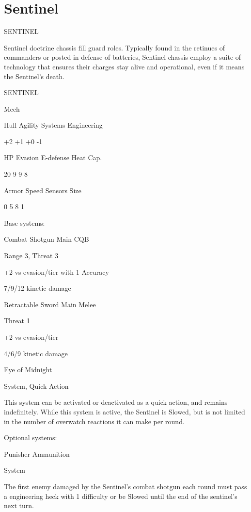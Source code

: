 \section{Sentinel}

                                              SENTINEL  

Sentinel doctrine chassis fill guard roles. Typically found in the retinues of commanders or posted  
in defense of batteries, Sentinel chassis employ a suite of technology that ensures their charges  
stay alive and operational, even if it means the Sentinel’s death. 
 

 SENTINEL 

 Mech 

 Hull       Agility     Systems       Engineering 

 +2         +1           +0           -1 

 HP         Evasion      E-defense    Heat Cap. 

 20         9            9            8 

 Armor      Speed       Sensors       Size 

 0          5            8            1
 

Base systems:  

Combat Shotgun  
Main CQB
 
Range 3, Threat 3
 
+2 vs evasion/tier with 1 Accuracy
 
7/9/12 kinetic damage
 

Retractable Sword  
Main Melee
 
Threat 1
 
+2 vs evasion/tier
 
4/6/9 kinetic damage
 

Eye of Midnight
 
System, Quick Action
 
This system can be activated or deactivated as a quick action, and remains indefinitely. While  
this system is active, the Sentinel is Slowed, but is not limited in the number of overwatch  
reactions it can make per round.
 

Optional systems:  

Punisher Ammunition  

                                                                                                         


System
 
The first enemy damaged by the Sentinel’s combat shotgun each round must pass a engineering  
heck with 1 difficulty or be Slowed until the end of the sentinel’s next turn.
 

